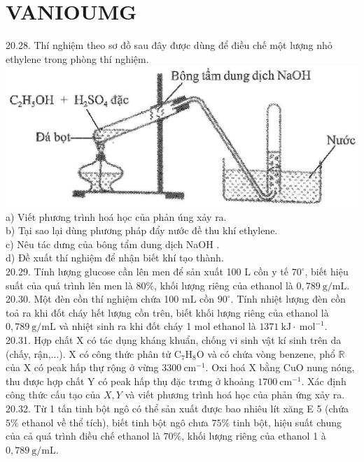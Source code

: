 \documentclass[10pt]{article}
\begin{document}
\section*{VANIOUMG}
20.28. Thí nghiệm theo sơ đồ sau đây được dùng để điều chế một lượng nhỏ ethylene trong phòng thí nghiệm.\\
\includegraphics[max width=\textwidth, center]{2025_10_23_fa9073eecee116ad8cf2g-69}\\
a) Viết phương trình hoá học của phản úng xảy ra.\\
b) Tại sao lại dùng phương pháp đẩy nước đề thu khí ethylene.\\
c) Nêu tác dưng của bông tẩm dung dịch NaOH .\\
d) Đề xuất thí nghiệm để nhận biết khí tạo thành.\\
20.29. Tính lượng glucose cần lên men để sản xuất 100 L cồn y tế $70^{\circ}$, biết hiệu suất của quá trình lên men là $80 \%$, khối lượng riêng của ethanol là $0,789 \mathrm{~g} / \mathrm{mL}$.\\
20.30. Một đèn cồn thí nghiệm chứa 100 mL cồn $90^{\circ}$. Tính nhiệt lượng đèn cồn toả ra khi đốt cháy hết lượng cồn trên, biết khối lượng riêng của ethanol là $0,789 \mathrm{~g} / \mathrm{mL}$ và nhiệt sinh ra khi đốt cháy 1 mol ethanol là $1371 \mathrm{~kJ} \cdot \mathrm{~mol}^{-1}$.\\
20.31. Hợp chất X có tác dụng kháng khuẩn, chống vi sinh vật kí sinh trên da (chấy, rận,...). X có công thức phân tử $\mathrm{C}_{7} \mathrm{H}_{8} \mathrm{O}$ và có chứa vòng benzene, phổ $\mathbb{R}$ của X có peak hấp thự rộng ở vừng $3300 \mathrm{~cm}^{-1}$. Oxi hoá X bằng CuO nung nóng, thu được hợp chất Y có peak hấp thụ đặc trưng ở khoảng $1700 \mathrm{~cm}^{-1}$. Xác định công thức cấu tạo của $X, Y$ và viết phương trình hoá học của phản ứng xảy ra.\\
20.32. Từ 1 tấn tinh bột ngô có thể sản xuất được bao nhiêu lít xăng E 5 (chứa $5 \%$ ethanol về thể tích), biết tinh bột ngô chưa $75 \%$ tinh bột, hiệu suất chung của cả quá trình điều chế ethanol là $70 \%$, khối lượng riêng của ethanol 1 à $0,789 \mathrm{~g} / \mathrm{mL}$.
\end{document}
